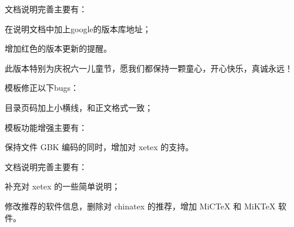 文档说明完善主要有：
\begin{hitlist}
   \item 在说明文档中加上google的版本库地址；
   \item 增加红色的版本更新的提醒。
\end{hitlist}


此版本特别为庆祝六一儿童节，愿我们都保持一颗童心，开心快乐，真诚永远！

模板修正以下bugs：
\begin{hitlist}
    \item 目录页码加上小横线，和正文格式一致；
\end{hitlist}


模板功能增强主要有：
\begin{hitlist}
    \item 保持文件 GBK 编码的同时，增加对 xetex 的支持。
\end{hitlist}

文档说明完善主要有：
\begin{hitlist}
   \item 补充对 xetex 的一些简单说明；
   \item 修改推荐的软件信息，删除对 chinatex 的推荐，增加 MiCTeX 和 MiKTeX 软件。
\end{hitlist}
